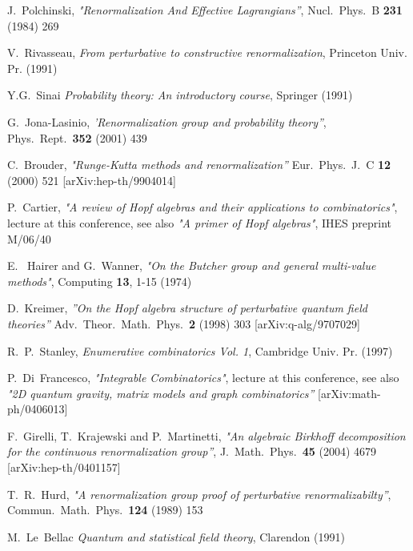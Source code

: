 \documentclass[12pt,here,feynmf]{article}
\begin{document}
\begin{thebibliography}{99}
J.~Polchinski,
  {\it "Renormalization And Effective Lagrangians''}, 
  Nucl.\ Phys.\  B {\bf 231} (1984) 269


  V.~Rivasseau,
  {\it From perturbative to constructive renormalization},
  Princeton Univ. Pr. (1991) 


Y.G.~Sinai {\it Probability theory: An introductory course}, Springer (1991)

G.~Jona-Lasinio,
  {\it 'Renormalization group and probability theory''},
  Phys.\ Rept.\  {\bf 352} (2001) 439
  
  
  
   C.~Brouder,
  {\it "Runge-Kutta methods and renormalization''}
  Eur.\ Phys.\ J.\  C {\bf 12} (2000) 521
  [arXiv:hep-th/9904014]

P.~Cartier,  {\it "A review of Hopf algebras and their applications to combinatorics"}, lecture at this conference, see also {\it "A primer of Hopf algebras"}, IHES preprint M/06/40

E.~ Hairer and G.~Wanner, {\it "On the Butcher group and general multi-value methods"}, Computing {\bf
13}, 1-15 (1974)

  D.~Kreimer,
  {\it ''On the Hopf algebra structure of perturbative quantum field theories''}
  Adv.\ Theor.\ Math.\ Phys.\  {\bf 2} (1998) 303
  [arXiv:q-alg/9707029]

R.~P.~Stanley, {\it Enumerative combinatorics Vol. 1},  Cambridge Univ. Pr.  (1997)


P.~Di~Francesco, {\it "Integrable Combinatorics"}, lecture at this conference, see also {\it "2D quantum gravity, matrix models and graph combinatorics''} [arXiv:math-ph/0406013]



  F.~Girelli, T.~Krajewski and P.~Martinetti,
  {\it "An algebraic Birkhoff decomposition for the continuous renormalization group''},
  J.\ Math.\ Phys.\  {\bf 45} (2004) 4679
  [arXiv:hep-th/0401157]


T.~R.~Hurd,
  {\it "A renormalization group proof of perturbative renormalizabilty''},
  Commun.\ Math.\ Phys.\  {\bf 124} (1989) 153





M.~Le~Bellac {\it Quantum and statistical field theory}, Clarendon (1991)



\end{thebibliography}
\end{document}
